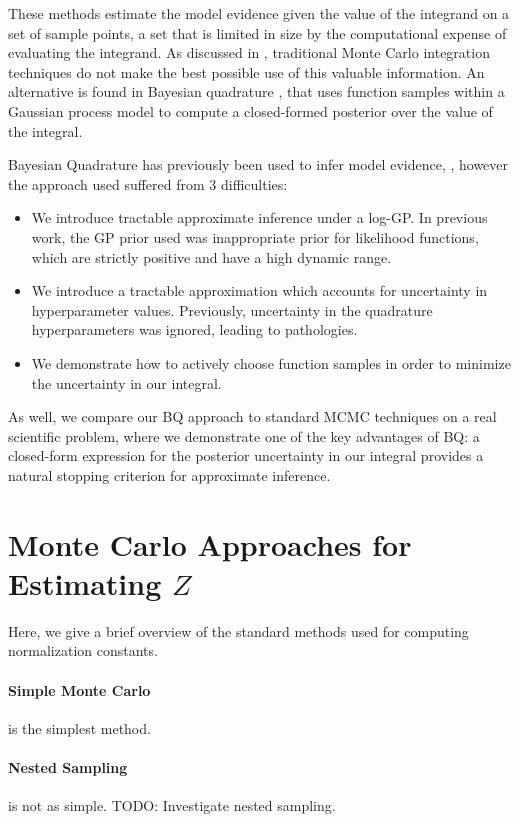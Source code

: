 \documentclass{article}
\begin{document}
These methods estimate the model evidence given the value of the integrand on a set of sample points, a set that is limited in size by the computational expense of evaluating the integrand. As discussed in \citep{MCUnsound}, traditional Monte Carlo integration techniques do not make the best possible use of this valuable information. An alternative is found in Bayesian quadrature \citep{BZHermiteQuadrature}, that uses function samples within a Gaussian process model to compute a closed-formed posterior over the value of the integral.

Bayesian Quadrature has previously been used to infer model evidence, \citep{BZMonteCarlo}, however the approach used suffered from 3 difficulties: 
\begin{itemize}
\item We introduce tractable approximate inference under a log-GP.  In previous work, the GP prior used was inappropriate prior for likelihood functions, which are strictly positive and have a high dynamic range.
\item We introduce a tractable approximation which accounts for uncertainty in hyperparameter values.  Previously, uncertainty in the quadrature hyperparameters was ignored, leading to pathologies.
\item We demonstrate how to actively choose function samples in order to minimize the uncertainty in our integral.
\end{itemize}
As well, we compare our BQ approach to standard MCMC techniques on a real scientific problem, where we demonstrate one of the key advantages of BQ: a closed-form expression for the posterior uncertainty in our integral provides a natural stopping criterion for approximate inference.

\section{Monte Carlo Approaches for Estimating $Z$}

Here, we give a brief overview of the standard methods used for computing normalization constants.

\paragraph*{Simple Monte Carlo} is the simplest method.
\paragraph*{Nested Sampling} is not as simple. TODO: Investigate nested sampling.
\end{document}
